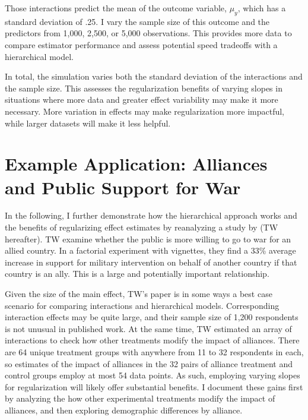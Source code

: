 \documentclass[12pt]{article}
\begin{document}
Those interactions predict the mean of the outcome variable, $\mu_y$, which has a standard deviation of .25. 
I vary the sample size of this outcome and the predictors from 1,000, 2,500, or 5,000 observations. 
This provides more data to compare estimator performance and assess potential speed tradeoffs with a hierarchical model.


In total, the simulation varies both the standard deviation of the interactions and the sample size. 
This assesses the regularization benefits of varying slopes in situations where more data and greater effect variability may make it more necessary.
More variation in effects may make regularization more impactful, while larger datasets will make it less helpful.




\section{Example Application: Alliances and Public Support for War} 


In the following, I further demonstrate how the hierarchical approach works and the benefits of regularizing effect estimates by reanalyzing a study by \citet{TomzWeeks2021} (TW hereafter). 
TW examine whether the public is more willing to go to war for an allied country.
In a factorial experiment with vignettes, they find a 33\% average increase in support for military intervention on behalf of another country if that country is an ally. 
This is a large and potentially important relationship. 


Given the size of the main effect, TW's paper is in some ways a best case scenario for comparing interactions and hierarchical models. 
Corresponding interaction effects may be quite large, and their sample size of 1,200 respondents is not unusual in published work. 
At the same time, TW estimated an array of interactions to check how other treatments modify the impact of alliances.
There are 64 unique treatment groups with anywhere from 11 to 32 respondents in each, so estimates of the impact of alliances in the 32 pairs of alliance treatment and control groups employ at most 54 data points. 
As such, employing varying slopes for regularization will likely offer substantial benefits. 
I document these gains first by analyzing the how other experimental treatments modify the impact of alliances, and then exploring demographic differences by alliance. 
\end{document}
